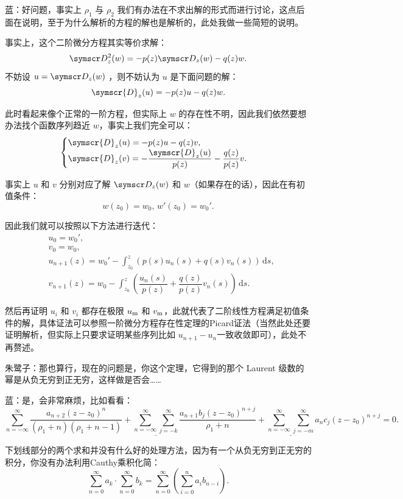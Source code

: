 蓝：好问题，事实上 \(\rho _1\) 与 \(\rho _2\) 我们有办法在不求出解的形式而进行讨论，这点后面在说明，至于为什么解析的方程的解也是解析的，此处我做一些简短的说明。

事实上，这个二阶微分方程其实等价求解：
\[
	\ddw= - p(z)\dw-q(z)w
	.\]
不妨设 \(u=\dw\) ，则不妨认为 \(u\) 是下面问题的解：
\[
	\symscr{D} _z(u) = -p(z) u - q(z) w
	.\]

此时看起来像个正常的一阶方程，但实际上 \(w\) 的存在性不明，因此我们依然要想办法找个函数序列趋近 \(w\)，事实上我们完全可以：
\[
	\begin{cases}
		\symscr{D} _z(u) = -p(z) u - q(z) v , \\
		\symscr{D} _z(v) = -\dfrac{\symscr{D} _z(u)}{p(z)}- \dfrac{q(z)}{p(z)} v.
	\end{cases}
\]

事实上 \(u\) 和 \(v\) 分别对应了解 \(\dw\) 和 \(w\)（如果存在的话），因此在有初值条件：
\[
	w(z_0)=w_0,\,w'(z_0)=w_0'
	.\]

因此我们就可以按照以下方法进行迭代：
\[
	\begin{aligned}
		 & u_0 = w_0' ,                                                                                               \\
		 & v_0=w_0    ,                                                                                               \\
		 & u_{n+1}(z) = w_0'-\int_{z_0}^z \left( p(s) u_n(s) + q(s) v_n(s) \right) \,\mathrm{d}s              ,       \\
		 & v_{n+1}(z) = w_0-\int_{z_0}^z \left( \dfrac{u_n(s) }{p(z)}+\dfrac{q(z)}{p(z)}v_n(s) \right) \,\mathrm{d}s.
	\end{aligned}
\]

然后再证明 \(u_i\) 和 \(v_i\) 都存在极限 \(u_{\rm m}\) 和 \(v_{\rm m}\)，此就代表了二阶线性方程满足初值条件的解，具体证法可以参照一阶微分方程存在性定理的Picard证法（当然此处还要证明解析，但实际上只要求证明某些序列比如 \(u_{n+1}-u_{n}\)一致收敛即可），此处不再赘述。

朱鹭子：那也算行，现在的问题是，你这个定理，它得到的那个 Laurent 级数的幂是从负无穷到正无穷，这样做是否会……

蓝：是，会非常麻烦，比如看看：
\[
	\sum_{n=-\infty}^{\infty} \frac{a_{n+2}(z-z_0)^n}{(\rho _1+n)(\rho _1+n-1)} +\underline{\sum_{n=-\infty}^{\infty} \sum_{j=-k}^{\infty}}\frac{a_{n+1}b_j(z-z_0)^{n+j}}{\rho _1+n}  +\underline{\sum_{n=-\infty}^{\infty} \sum_{j=-m}^{\infty}} a_n c_j (z-z_0)^{n+j}=0
	.\]

下划线部分的两个求和并没有什么好的处理方法，因为有一个从负无穷到正无穷的积分，你没有办法利用Cauthy乘积化简：
\[
	\sum_{n=0}^{\infty} a_k \cdot \sum_{n=0}^{\infty} b_k = \sum_{n=0}^{\infty} \left( \sum_{i=0}^{n} a_i b_{n-i} \right)
	.\]

